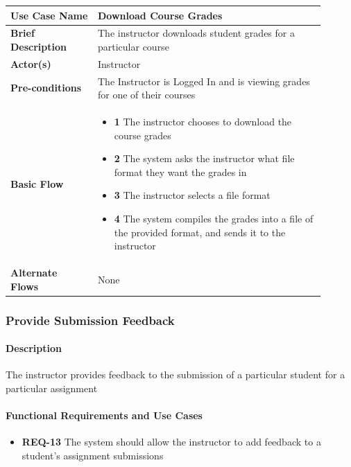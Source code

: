 \documentclass{article}
\begin{document}
\vspace{0.2in}

\begin{tabular}{| p{0.25\linewidth} | p{0.65\linewidth} |}
  \hline
  \textbf{Use Case Name} & Download Course Grades \\
  \hline
  \textbf{Brief Description} & The instructor downloads student grades for a particular course \\
  \hline
  \textbf{Actor(s)} & Instructor \\
  \hline
  \textbf{Pre-conditions} & The Instructor is Logged In and is viewing grades for one of their courses\\
  \hline
  \textbf{Basic Flow} & \begin{itemize}
    \item[] \textbf{1} The instructor chooses to download the course grades
    \item[] \textbf{2} The system asks the instructor what file format they want the grades in
    \item[] \textbf{3} The instructor selects a file format
    \item[] \textbf{4} The system compiles the grades into a file of the provided format, and sends it to the instructor
  \end{itemize}\\
  \hline
  \textbf{Alternate Flows} & None\\
  \hline
\end{tabular}

\subsubsection{Provide Submission Feedback}

\paragraph{Description} The instructor provides feedback to the submission of a particular student for a particular assignment

\paragraph{Functional Requirements and Use Cases}

\begin{itemize}
  \item \textbf{REQ-13} The system should allow the instructor to add feedback to a student's assignment submissions
\end{itemize}
\end{document}

